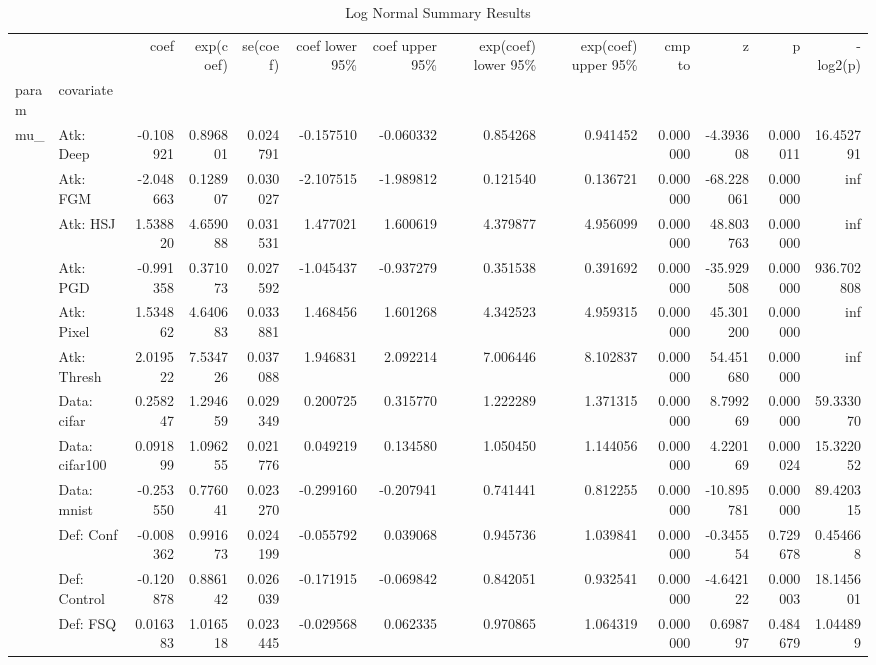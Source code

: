 \begin{table}[htbp]
\caption{Log Normal Summary Results}
\label{tab:log_normal_summary}
\begin{tabular}{llrrrrrrrrrrr}
\toprule
 &  & coef & exp(coef) & se(coef) & coef lower 95\% & coef upper 95\% & exp(coef) lower 95\% & exp(coef) upper 95\% & cmp to & z & p & -log2(p) \\
param & covariate &  &  &  &  &  &  &  &  &  &  &  \\
\midrule
\multirow[t]{23}{*}{mu\_} & Atk: Deep & -0.108921 & 0.896801 & 0.024791 & -0.157510 & -0.060332 & 0.854268 & 0.941452 & 0.000000 & -4.393608 & 0.000011 & 16.452791 \\
 & Atk: FGM & -2.048663 & 0.128907 & 0.030027 & -2.107515 & -1.989812 & 0.121540 & 0.136721 & 0.000000 & -68.228061 & 0.000000 & inf \\
 & Atk: HSJ & 1.538820 & 4.659088 & 0.031531 & 1.477021 & 1.600619 & 4.379877 & 4.956099 & 0.000000 & 48.803763 & 0.000000 & inf \\
 & Atk: PGD & -0.991358 & 0.371073 & 0.027592 & -1.045437 & -0.937279 & 0.351538 & 0.391692 & 0.000000 & -35.929508 & 0.000000 & 936.702808 \\
 & Atk: Pixel & 1.534862 & 4.640683 & 0.033881 & 1.468456 & 1.601268 & 4.342523 & 4.959315 & 0.000000 & 45.301200 & 0.000000 & inf \\
 & Atk: Thresh & 2.019522 & 7.534726 & 0.037088 & 1.946831 & 2.092214 & 7.006446 & 8.102837 & 0.000000 & 54.451680 & 0.000000 & inf \\
 & Data: cifar & 0.258247 & 1.294659 & 0.029349 & 0.200725 & 0.315770 & 1.222289 & 1.371315 & 0.000000 & 8.799269 & 0.000000 & 59.333070 \\
 & Data: cifar100 & 0.091899 & 1.096255 & 0.021776 & 0.049219 & 0.134580 & 1.050450 & 1.144056 & 0.000000 & 4.220169 & 0.000024 & 15.322052 \\
 & Data: mnist & -0.253550 & 0.776041 & 0.023270 & -0.299160 & -0.207941 & 0.741441 & 0.812255 & 0.000000 & -10.895781 & 0.000000 & 89.420315 \\
 & Def: Conf & -0.008362 & 0.991673 & 0.024199 & -0.055792 & 0.039068 & 0.945736 & 1.039841 & 0.000000 & -0.345554 & 0.729678 & 0.454668 \\
 & Def: Control & -0.120878 & 0.886142 & 0.026039 & -0.171915 & -0.069842 & 0.842051 & 0.932541 & 0.000000 & -4.642122 & 0.000003 & 18.145601 \\
 & Def: FSQ & 0.016383 & 1.016518 & 0.023445 & -0.029568 & 0.062335 & 0.970865 & 1.064319 & 0.000000 & 0.698797 & 0.484679 & 1.044899 \\

\end{tabular}
\end{table}
